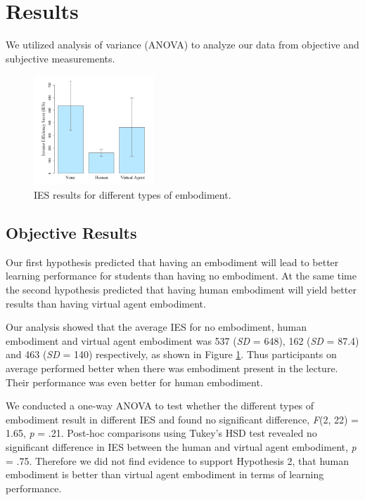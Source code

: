 \documentclass{sigchi}
\begin{document}
\section{Results}

We utilized analysis of variance (ANOVA) to analyze our data from objective and subjective measurements.

\begin{figure}[t]
	\centering
        \includegraphics[width=0.4\textwidth]{Figures/IES.jpg}
        \caption{IES results for different types of embodiment.}
        \label{fig:IES}
\end{figure}

\subsection{Objective Results}

Our first hypothesis predicted that having an embodiment will lead to better learning performance for students than having no embodiment. At the same time the second hypothesis predicted that having human embodiment will yield better results than having virtual agent embodiment.

Our analysis showed that the average IES for no embodiment, human embodiment and virtual agent embodiment was 537 (\textit{SD} = 648), 162 (\textit{SD} = 87.4) and 463 (\textit{SD} = 140) respectively, as shown in Figure \ref{fig:IES}. Thus participants on average performed better when there was embodiment present in the lecture. Their performance was even better for human embodiment.

We conducted a one-way ANOVA to test whether the different types of embodiment result in different IES and found no significant difference, \textit{F}(2, 22) = 1.65, \textit{p} = .21. Post-hoc comparisons using Tukey’s HSD test revealed no significant difference in IES between the human and virtual agent embodiment, \textit{p} = .75. Therefore we did not find evidence to support Hypothesis 2, that human embodiment is better than virtual agent embodiment in terms of learning performance.
\end{document}
